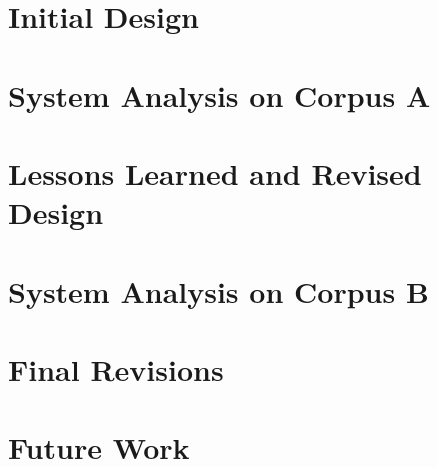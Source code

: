 \documentclass[11pt,letterpaper]{article}
\begin{document}
\section{Initial Design}

\section{System Analysis on Corpus A}

\section{Lessons Learned and Revised Design}

\section{System Analysis on Corpus B}

\section{Final Revisions}

\section{Future Work}







\label{lastpage}
\end{document}
